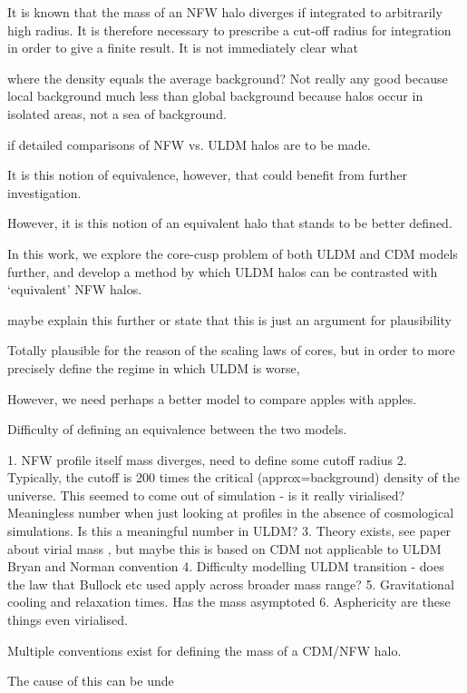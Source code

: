 \documentclass[a4paper,11pt]{article}
\begin{document}
It is known that the mass of an NFW halo diverges if integrated to arbitrarily high radius. It is therefore necessary to prescribe a cut-off radius for integration in order to give a finite result. It is not immediately clear what 

where the density equals the average background? Not really any good because local background much less than global background because halos occur in isolated areas, not a sea of background.

if detailed comparisons of NFW vs. ULDM halos are to be made. 

It is this notion of equivalence, however, that could benefit from further investigation.

However, it is this notion of an equivalent halo that stands to be better defined.

In this work, we explore the core-cusp problem of both ULDM and CDM models further, and develop a method by which ULDM halos can be contrasted with `equivalent' NFW halos. 


maybe explain this further or state that this is just an argument for plausibility

Totally plausible for the reason of the scaling laws of cores, but in order to more precisely define the regime in which ULDM is worse, 

However, we need perhaps a better model to compare apples with apples. 

Difficulty of defining an equivalence between the two models. 

1. NFW profile itself mass diverges, need to define some cutoff radius
2. Typically, the cutoff is 200 times the critical (approx=background) density of the universe. This seemed to come out of simulation - is it really virialised? Meaningless number when just looking at profiles in the absence of cosmological simulations.
Is this a meaningful number in ULDM?
3. Theory exists, see paper about virial mass \cite{https://arxiv.org/pdf/1005.0411.pdf}, but maybe this is based on CDM not applicable to ULDM
Bryan and Norman convention
4. Difficulty modelling ULDM transition - does the law that Bullock etc used apply across broader mass range?
5. Gravitational cooling and relaxation times. Has the mass asymptoted
6. Asphericity
are these things even virialised.

Multiple conventions exist for defining the mass of a CDM/NFW halo.



The cause of this can be unde
\end{document}
